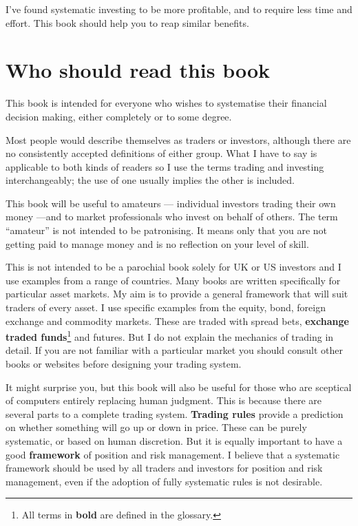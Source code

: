 I've found systematic investing to be more profitable, and to require less time and effort. This book should help you to reap similar benefits.

\section*{Who should read this book}  {}

This book is intended for everyone who wishes to systematise their financial decision making, either completely or to some degree.

Most people would describe themselves as traders or investors, although there are no consistently accepted definitions of either group. What I have to say is applicable to both kinds of readers so I use the terms trading and investing interchangeably; the use of one usually implies the other is included.

This book will be useful to amateurs --- individual investors trading their own money ---and to market professionals who invest on behalf of others. The term ``amateur'' is not intended to be patronising. It means only that you are not getting paid to manage money and is no reflection on your level of skill.

This is not intended to be a parochial book solely for UK or US investors and I use examples from a range of countries. Many books are written specifically for particular asset markets. My aim is to provide a general framework that will suit traders of every asset. I use specific examples from the equity, bond, foreign exchange and commodity markets. These are traded with spread bets, \textbf{exchange traded funds}\footnote{All terms in \textbf{bold} are defined in the glossary.} and futures. But I do not explain the mechanics of trading in detail. If you are not familiar with a particular market you should consult other books or websites before designing your trading system.

It might surprise you, but this book will also be useful for those who are sceptical of computers entirely replacing human judgment. This is because there are several parts to a complete trading system. \textbf{Trading rules} provide a prediction on whether something will go up or down in price. These can be purely systematic, or based on human discretion. But it is equally important to have a good \textbf{framework} of position and risk management. I believe that a systematic framework should be used by all traders and investors for position and risk management, even if the adoption of fully systematic rules is not desirable.

